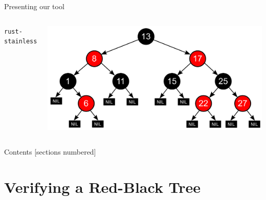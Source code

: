 \begin{frame}{Presenting our tool}
  \begin{columns}
  \centering
  \Large{\texttt{rust-stainless}}

  \centering
  \includegraphics[width=\textwidth]{img/rbtree.png}
\end{columns}
\end{frame}


\begin{frame}{Contents}
  [sections numbered]

  \tableofcontents%
\end{frame}

\section{Verifying a Red-Black Tree}

